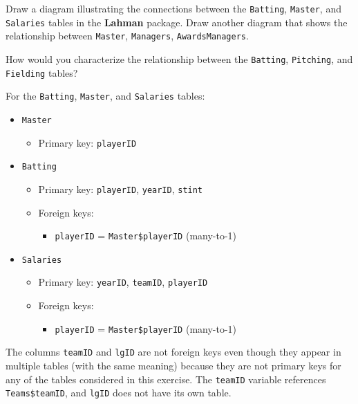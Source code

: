 \documentclass[]{book}
\providecommand{\tightlist}{%
  \setlength{\itemsep}{0pt}\setlength{\parskip}{0pt}}
\theoremstyle{plain}
\theoremstyle{remark}
\begin{document}
Draw a diagram illustrating the connections between the \texttt{Batting}, \texttt{Master}, and \texttt{Salaries} tables in the \textbf{Lahman} package. Draw another diagram that shows the relationship between \texttt{Master}, \texttt{Managers}, \texttt{AwardsManagers}.

How would you characterize the relationship between the \texttt{Batting}, \texttt{Pitching}, and \texttt{Fielding} tables?

For the \texttt{Batting}, \texttt{Master}, and \texttt{Salaries} tables:

\begin{itemize}
\item
  \texttt{Master}

  \begin{itemize}
  \tightlist
  \item
    Primary key: \texttt{playerID}
  \end{itemize}
\item
  \texttt{Batting}

  \begin{itemize}
  \item
    Primary key: \texttt{playerID}, \texttt{yearID}, \texttt{stint}
  \item
    Foreign keys:

    \begin{itemize}
    \tightlist
    \item
      \texttt{playerID} = \texttt{Master\$playerID} (many-to-1)
    \end{itemize}
  \end{itemize}
\item
  \texttt{Salaries}

  \begin{itemize}
  \item
    Primary key: \texttt{yearID}, \texttt{teamID}, \texttt{playerID}
  \item
    Foreign keys:

    \begin{itemize}
    \tightlist
    \item
      \texttt{playerID} = \texttt{Master\$playerID} (many-to-1)
    \end{itemize}
  \end{itemize}
\end{itemize}

The columns \texttt{teamID} and \texttt{lgID} are not foreign keys even though they appear in multiple tables (with the same meaning) because they are not primary keys for any of the tables considered in this exercise.
The \texttt{teamID} variable references \texttt{Teams\$teamID}, and \texttt{lgID} does not have its own table.
\end{document}
